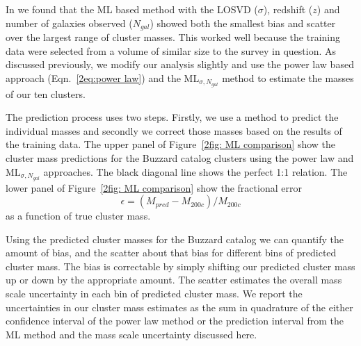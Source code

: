 In  we found that the ML based method with the LOSVD ($\sigma$), redshift ($z$) and number of galaxies observed ($N_{gal}$) showed both the smallest bias and scatter over the largest range of cluster masses. This worked well because the training data were selected from a volume of similar size to the survey in question. As discussed previously, we modify our analysis slightly and use the power law based approach (Eqn.~\ref{2eq:power law}) and the $\mathrm{ML}_{\sigma, N_{gal}}$ method to estimate the masses of our ten clusters.

The prediction process uses two steps. Firstly, we use a method to predict the individual masses and secondly we correct those masses based on the results of the training data. The upper panel of Figure~\ref{2fig: ML comparison} show the cluster mass predictions for the Buzzard catalog clusters using the power law and $\mathrm{ML}_{\sigma, N_{gal}}$ approaches. The black diagonal line shows the perfect 1:1 relation. The lower panel of Figure~\ref{2fig: ML comparison} show the fractional error 
\begin{equation}\label{2eq: fractional error}
	\epsilon = (M_{pred} - M_{200c})/M_{200c}
\end{equation}
as a function of true cluster mass.

Using the predicted cluster masses for the Buzzard catalog we can quantify the amount of bias, and the scatter about that bias for different bins of predicted cluster mass. The bias is correctable by simply shifting our predicted cluster mass up or down by the appropriate amount. The scatter estimates the overall mass scale uncertainty in each bin of predicted cluster mass. We report the uncertainties in our cluster mass estimates as the sum in quadrature of the either confidence interval of the power law method or the prediction interval from the ML method and the mass scale uncertainty discussed here. 

